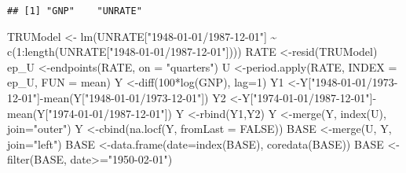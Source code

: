 \documentclass[
]{book}
\newenvironment{Shaded}{\begin{snugshade}}{\end{snugshade}}
\newcommand{\AttributeTok}[1]{\textcolor[rgb]{0.77,0.63,0.00}{#1}}
\newcommand{\ConstantTok}[1]{\textcolor[rgb]{0.00,0.00,0.00}{#1}}
\newcommand{\DecValTok}[1]{\textcolor[rgb]{0.00,0.00,0.81}{#1}}
\newcommand{\FunctionTok}[1]{\textcolor[rgb]{0.00,0.00,0.00}{#1}}
\newcommand{\NormalTok}[1]{#1}
\newcommand{\OtherTok}[1]{\textcolor[rgb]{0.56,0.35,0.01}{#1}}
\newcommand{\SpecialCharTok}[1]{\textcolor[rgb]{0.00,0.00,0.00}{#1}}
\newcommand{\StringTok}[1]{\textcolor[rgb]{0.31,0.60,0.02}{#1}}
\begin{document}
\begin{verbatim}
## [1] "GNP"    "UNRATE"
\end{verbatim}

\begin{Shaded}
\begin{Highlighting}[]
\NormalTok{TRUModel   }\OtherTok{\textless{}{-}} \FunctionTok{lm}\NormalTok{(UNRATE[}\StringTok{"1948{-}01{-}01/1987{-}12{-}01"}\NormalTok{] }\SpecialCharTok{\textasciitilde{}} \FunctionTok{c}\NormalTok{(}\DecValTok{1}\SpecialCharTok{:}\FunctionTok{length}\NormalTok{(UNRATE[}\StringTok{"1948{-}01{-}01/1987{-}12{-}01"}\NormalTok{])))}
\NormalTok{RATE       }\OtherTok{\textless{}{-}}\FunctionTok{resid}\NormalTok{(TRUModel) }
\NormalTok{ep\_U       }\OtherTok{\textless{}{-}}\FunctionTok{endpoints}\NormalTok{(RATE, }\AttributeTok{on =} \StringTok{"quarters"}\NormalTok{)}
\NormalTok{U          }\OtherTok{\textless{}{-}}\FunctionTok{period.apply}\NormalTok{(RATE, }\AttributeTok{INDEX =}\NormalTok{ ep\_U, }\AttributeTok{FUN =}\NormalTok{ mean)}
\NormalTok{Y          }\OtherTok{\textless{}{-}}\FunctionTok{diff}\NormalTok{(}\DecValTok{100}\SpecialCharTok{*}\FunctionTok{log}\NormalTok{(GNP), }\AttributeTok{lag=}\DecValTok{1}\NormalTok{)}
\NormalTok{Y1         }\OtherTok{\textless{}{-}}\NormalTok{Y[}\StringTok{"1948{-}01{-}01/1973{-}12{-}01"}\NormalTok{]}\SpecialCharTok{{-}}\FunctionTok{mean}\NormalTok{(Y[}\StringTok{"1948{-}01{-}01/1973{-}12{-}01"}\NormalTok{])  }
\NormalTok{Y2         }\OtherTok{\textless{}{-}}\NormalTok{Y[}\StringTok{"1974{-}01{-}01/1987{-}12{-}01"}\NormalTok{]}\SpecialCharTok{{-}}\FunctionTok{mean}\NormalTok{(Y[}\StringTok{"1974{-}01{-}01/1987{-}12{-}01"}\NormalTok{]) }
\NormalTok{Y          }\OtherTok{\textless{}{-}}\FunctionTok{rbind}\NormalTok{(Y1,Y2)}
\NormalTok{Y          }\OtherTok{\textless{}{-}}\FunctionTok{merge}\NormalTok{(Y, }\FunctionTok{index}\NormalTok{(U), }\AttributeTok{join=}\StringTok{"outer"}\NormalTok{)}
\NormalTok{Y          }\OtherTok{\textless{}{-}}\FunctionTok{cbind}\NormalTok{(}\FunctionTok{na.locf}\NormalTok{(Y, }\AttributeTok{fromLast =} \ConstantTok{FALSE}\NormalTok{))}
\NormalTok{BASE       }\OtherTok{\textless{}{-}}\FunctionTok{merge}\NormalTok{(U, Y, }\AttributeTok{join=}\StringTok{"left"}\NormalTok{)}
\NormalTok{BASE       }\OtherTok{\textless{}{-}}\FunctionTok{data.frame}\NormalTok{(}\AttributeTok{date=}\FunctionTok{index}\NormalTok{(BASE), }\FunctionTok{coredata}\NormalTok{(BASE))}
\NormalTok{BASE       }\OtherTok{\textless{}{-}}\FunctionTok{filter}\NormalTok{(BASE, date}\SpecialCharTok{\textgreater{}=}\StringTok{"1950{-}02{-}01"}\NormalTok{)}

\end{Highlighting}
\end{Shaded}
\end{document}

